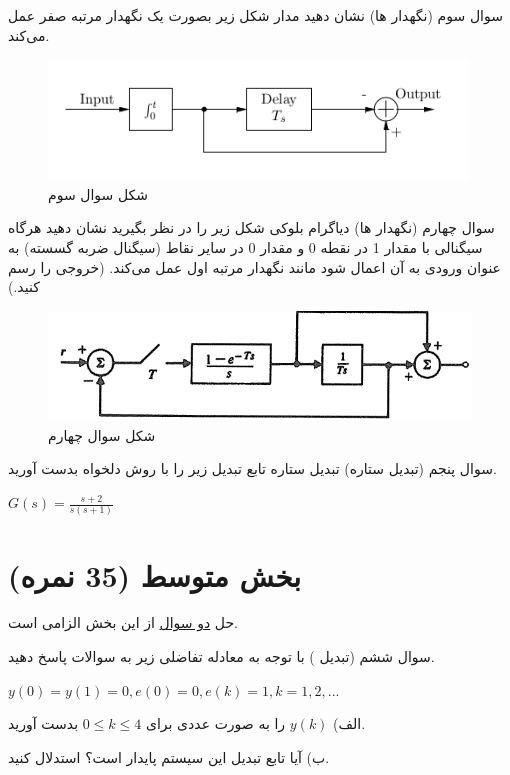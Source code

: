 \documentclass{article}
\begin{document}
    \begin{problem}{سوال سوم}
    	(نگهدار ها) نشان دهید مدار شکل زیر بصورت یک نگهدار مرتبه صفر عمل می‌کند.
    \end{problem}
    
    \begin{figure}[htbp]
    	\centering
    	\includegraphics{Second Series/4.png}
    	\caption{شکل سوال سوم}
    \end{figure}
    
    
    \begin{problem}{سوال چهارم}
    	(نگهدار ها) دیاگرام بلوکی شکل زیر را در نظر بگیرید نشان دهید هرگاه سیگنالی با مقدار 1 در نقطه 0 و مقدار 0 در سایر نقاط (سیگنال ضربه گسسته) به عنوان ورودی به آن اعمال شود مانند نگهدار مرتبه اول عمل می‌کند. (خروجی را رسم کنید.)
    \end{problem}
    \begin{figure}[htbp]
    	\includegraphics[width=\linewidth]{Second Series/5.png}
    	\caption{شکل سوال چهارم}
    \end{figure}
    
    \begin{problem}{سوال پنجم}
    	(تبدیل ستاره) تبدیل ستاره تابع تبدیل زیر را با روش دلخواه بدست آورید.
    	
    	\centering
    	$G(s) = \frac{s+2}{s(s+1)}$
    	
    	\raggedright
    \end{problem}
\raggedleft    
\section{بخش متوسط (35 نمره)}
\centering
حل \underline{دو سوال} از این بخش الزامی است.
\begin{problem}{سوال ششم}
	(تبدیل ) با توجه به معادله تفاضلی زیر به سوالات پاسخ دهید.

\centering
$y(0) = y(1) = 0 , e(0) = 0 , e(k) = 1 , k = 1,2,...$



\raggedright

الف) $y(k)$ را به صورت عددی برای
$0 \leq k \leq 4$
 بدست آورید.
  
  ب) آیا تابع تبدیل این سیستم پایدار است؟ استدلال کنید.

\end{problem}
	
\end{document}
